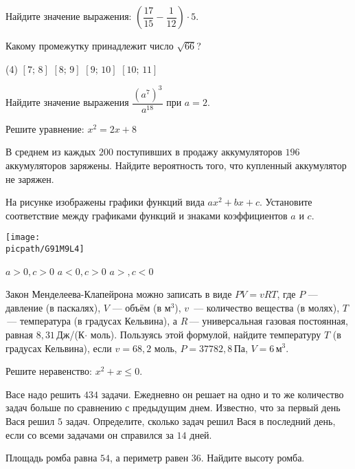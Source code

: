 \begin{class}[number=8]
	\begin{listofex}
		\item Найдите значение выражения: \(\left( \dfrac{ 17 }{ 15 }-\dfrac{ 1 }{ 12 }\right)\cdot5 \).
		\item Какому промежутку принадлежит число \(\sqrt{66}\)?
		\begin{tasks}(4)
			\task \( [7;\,8] \)
			\task \( [8;\,9] \)
			\task \( [9;\,10] \)
			\task \( [10;\,11] \)
		\end{tasks}
		\item Найдите значение выражения \( \dfrac{(a^7)^3}{a^{18}} \) при \( a=2 \).
		\item Решите уравнение: \( x^2=2x+8 \)
		\item В среднем из каждых \(200\) поступивших в продажу аккумуляторов \(196\) аккумуляторов заряжены. Найдите вероятность того, что купленный аккумулятор не заряжен.
		\item На рисунке изображены графики функций вида \(ax^2+bx+c\). Установите соответствие между графиками функций и знаками коэффициентов \(a\) и \(c\).
		\begin{center}
			\texttt{[image: \\picpath/G91M9L4]}
		\end{center}
		\begin{tasks}
			\task \( a>0, c>0 \)
			\task \( a<0, c>0 \)
			\task \( a>, c<0 \)
		\end{tasks}
		\item Закон Менделеева-Клапейрона можно записать в виде \(PV=vRT\), где \(P\) --- давление (в паскалях), \(V\) --- объём (в м\(^3\)), \(v\)  --- количество вещества (в молях), \(T\) --- температура (в градусах Кельвина), а \(R\) --- универсальная газовая постоянная, равная \(8,31\) Дж/(К\(\cdot\) моль). Пользуясь этой формулой, найдите температуру \(T\) (в градусах Кельвина), если \(v=68,2\) моль, \(P=37 782,8\) Па, \(V=6\) м\(^3\).
		\item Решите неравенство: \(x^2+x\le0\).
		\item Васе надо решить \(434\) задачи. Ежедневно он решает на одно и то же количество задач больше по сравнению с предыдущим днем. Известно, что за первый день Вася решил \(5\) задач. Определите, сколько задач решил Вася в последний день, если со всеми задачами он справился за \(14\) дней.
		\item Площадь ромба равна \( 54 \), а периметр равен \( 36 \). Найдите высоту ромба.

\end{listofex}
\end{class}
